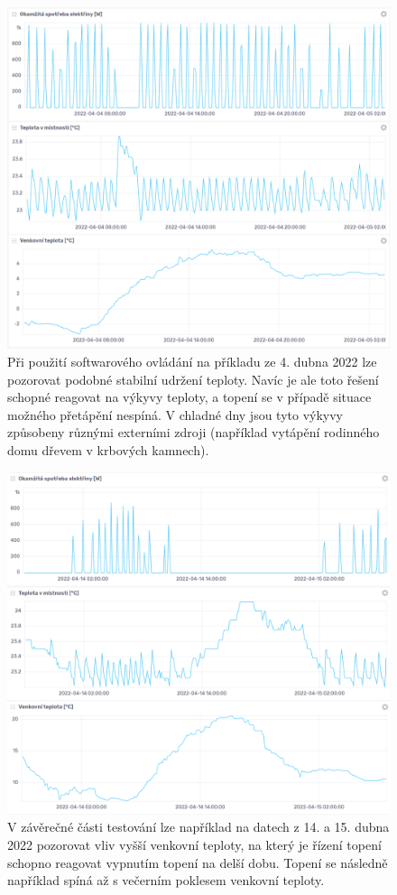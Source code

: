 \begin{figure}[hbt]
\centering
\includegraphics[width=\textwidth]{obrazky-figures/test-graph-ml.png}
\caption{Při použití softwarového ovládání na příkladu ze 4. dubna 2022 lze pozorovat podobné stabilní udržení teploty. Navíc je ale toto řešení schopné reagovat na výkyvy teploty, a topení se v případě situace možného přetápění nespíná. V chladné dny jsou tyto výkyvy způsobeny různými externími zdroji (například vytápění rodinného domu dřevem v krbových kamnech).}
\end{figure}

\begin{figure}[hbt]
\centering
\includegraphics[width=\textwidth]{obrazky-figures/test-weather.png}
\caption{V závěrečné části testování lze například na datech z 14. a 15. dubna 2022 pozorovat vliv vyšší venkovní teploty, na který je řízení topení schopno reagovat vypnutím topení na delší dobu. Topení se následně například spíná až s večerním poklesem venkovní teploty.}
\end{figure}



